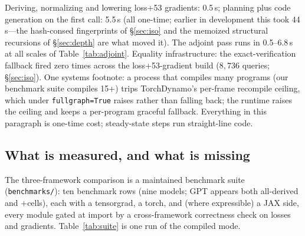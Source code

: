 \documentclass[sigplan,10pt,review]{acmart}
\begin{document}
Deriving, normalizing and lowering loss+53 gradients: 0.5\,s; planning
plus code generation on the first call: 5.5\,s (all one-time; earlier in
development this took 44\,s---the hash-consed fingerprints of
\S\ref{sec:iso} and the memoized structural recursions of
\S\ref{sec:depth} are what moved it). The adjoint pass runs in
0.5--6.8\,s at all scales of Table~\ref{tab:adjoint}. Equality
infrastructure: the exact-verification fallback fired zero times across
the loss+53-gradient build ($8{,}736$ queries; \S\ref{sec:iso}). One
systems footnote: a process that
compiles many programs (our benchmark suite compiles 15+) trips
TorchDynamo's per-frame recompile ceiling, which under
\texttt{fullgraph=True} raises rather than falling back; the runtime
raises the ceiling and keeps a per-program graceful fallback.
Everything in this paragraph is one-time cost; steady-state steps run
straight-line code.

\subsection{What is measured, and what is missing}\label{sec:eval-todo}

The three-framework comparison is a maintained benchmark suite
(\texttt{benchmarks/}): ten benchmark rows (nine models; GPT appears
both all-derived and $+$cells), each with a
tensorgrad, a torch, and (where expressible) a JAX side, every module
gated at import by a cross-framework correctness check on losses and
gradients. Table~\ref{tab:suite} is one run of the compiled mode.
\end{document}
